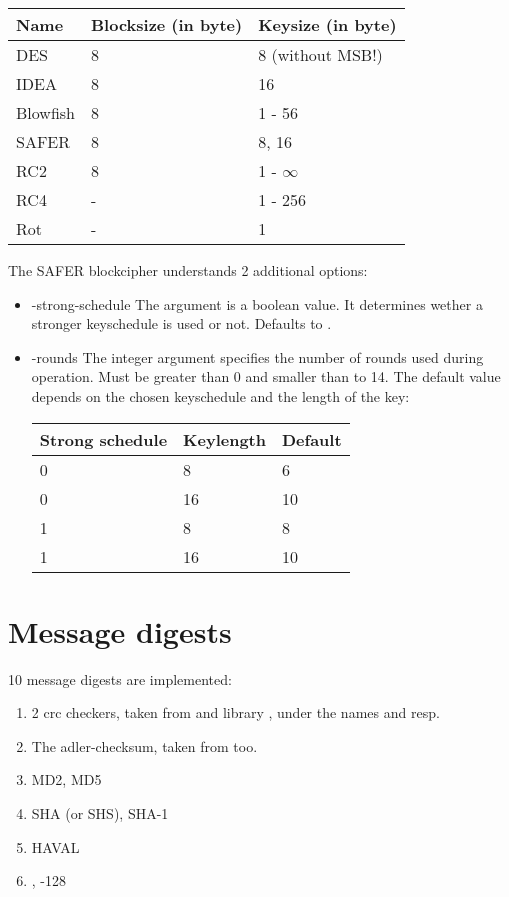 \documentclass {report}
\begin{document}
\begin {center}
	\begin {tabular}{|l|l|l|}\hline
	Name		& Blocksize (in byte)	& Keysize (in byte) \\ \hline\hline
	DES		& 8			& 8 (without MSB!) \\ \hline
	IDEA		& 8			& 16 \\ \hline
	Blowfish	& 8			& 1 - 56 \\ \hline
	SAFER		& 8			& 8, 16 \\ \hline
	RC2		& 8			& 1 - $\infty$ \\ \hline\hline
	RC4		& -			& 1 - 256 \\ \hline
	Rot		& -			& 1	\\ \hline
	\end   {tabular}
\end   {center}

The SAFER blockcipher understands 2 additional options:

\begin {itemize}
\item [-strong-schedule]
	The argument is a boolean value. It determines wether a
	stronger keyschedule is used or not. Defaults to .

\item [-rounds]
	The integer argument specifies the number of rounds used
	during operation. Must be greater than 0 and smaller than to
	14. The default value depends on the chosen keyschedule and
	the length of the key:

	\begin {tabular} {|l|l|l|}\hline
	Strong schedule & Keylength & Default	\\ \hline\hline
	0		&  8	    &	 6	\\ \hline
	0		& 16	    &	10	\\ \hline
	1		&  8	    &	 8	\\ \hline
	1		& 16	    &	10	\\ \hline
	\end  {tabular}
\end   {itemize}

\section {Message digests}

10 message digests are implemented:

\begin {enumerate}
\item	2 crc checkers, taken from \PGP{} and library \zlib, under
	the names  and  resp.
\item	The adler-checksum, taken from \zlib{} too.
\item	MD2, MD5
\item	SHA (or SHS), SHA-1
\item	HAVAL
\item	\rmd, -128
\end   {enumerate}
\end{document}
